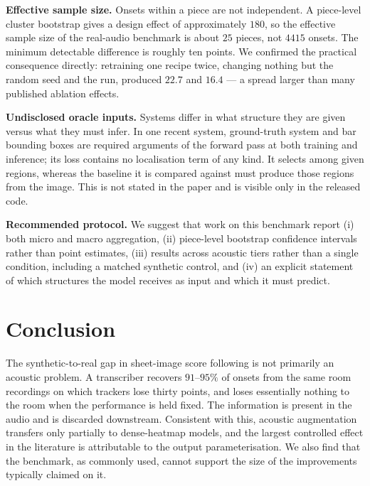 \documentclass{article}
\begin{document}
\noindent\textbf{Effective sample size.} Onsets within a piece are not
independent. A piece-level cluster bootstrap gives a design effect of
approximately $180$, so the effective sample size of the real-audio benchmark
is about $25$ pieces, not $4415$ onsets. The minimum detectable difference is
roughly ten points. We confirmed the practical consequence directly: retraining
one recipe twice, changing nothing but the random seed and the run, produced
$22.7$ and $16.4$ --- a spread larger than many published ablation effects.

\noindent\textbf{Undisclosed oracle inputs.} Systems differ in what structure
they are given versus what they must infer. In one recent system, ground-truth
system and bar bounding boxes are required arguments of the forward pass at
both training and inference; its loss contains no localisation term of any
kind. It selects among given regions, whereas the baseline it is compared
against must produce those regions from the image. This is not stated in the
paper and is visible only in the released code.

\noindent\textbf{Recommended protocol.} We suggest that work on this benchmark
report (i) both micro and macro aggregation, (ii) piece-level bootstrap
confidence intervals rather than point estimates, (iii) results across acoustic
tiers rather than a single condition, including a matched synthetic control,
and (iv) an explicit statement of which structures the model receives as input
and which it must predict.

\section{Conclusion}
\label{sec:conclusion}

The synthetic-to-real gap in sheet-image score following is not primarily an
acoustic problem. A transcriber recovers $91$--$95\%$ of onsets from the same
room recordings on which trackers lose thirty points, and loses essentially
nothing to the room when the performance is held fixed. The information is
present in the audio and is discarded downstream. Consistent with this,
acoustic augmentation transfers only partially to dense-heatmap models, and the
largest controlled effect in the literature is attributable to the output
parameterisation. We also find that the benchmark, as commonly used, cannot
support the size of the improvements typically claimed on it.

\vfill\pagebreak



\end{document}
